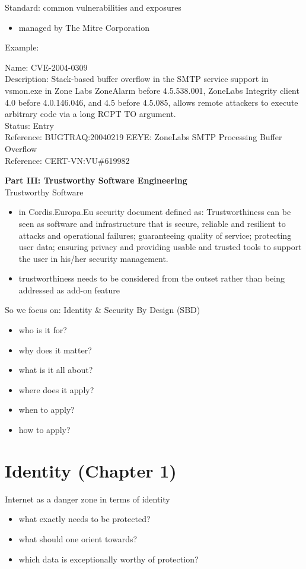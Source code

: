 \documentclass[11pt]{article}
\begin{document}
Standard: common vulnerabilities and exposures
\begin{itemize}
\item managed by The Mitre Corporation
\end{itemize}

Example:

Name: CVE-2004-0309\\
Description: Stack-based buffer overflow in the SMTP service support in vsmon.exe in Zone Labs ZoneAlarm before 4.5.538.001, ZoneLabs Integrity client 4.0 before 4.0.146.046, and 4.5 before 4.5.085, allows remote attackers to execute arbitrary code via a long RCPT TO argument.\\
Status: Entry\\
Reference: BUGTRAQ:20040219 EEYE: ZoneLabs SMTP Processing Buffer Overflow\\
Reference: CERT-VN:VU\#619982 

\textbf{Part III: Trustworthy Software Engineering}\\

Trustworthy Software
\begin{itemize}
\item in Cordis.Europa.Eu security document defined as: Trustworthiness can be seen as software and infrastructure that is secure, reliable and resilient to attacks and operational failures; guaranteeing quality of service; protecting user data; ensuring privacy and providing usable and trusted tools to support the user in his/her security management.
\item trustworthiness needs to be considered from the outset rather than being addressed as add-on feature
\end{itemize}

So we focus on: Identity \& Security By Design (SBD)
\begin{itemize}
\item who is it for?
\item why does it matter?
\item what is it all about?
\item where does it apply?
\item when to apply?
\item how to apply?
\end{itemize}

\section{Identity (Chapter 1)}
\label{sec:org1887131}
Internet as a danger zone in terms of identity
\begin{itemize}
\item what exactly needs to be protected?
\item what should one orient towards?
\item which data is exceptionally worthy of protection?
\end{itemize}
\end{document}
